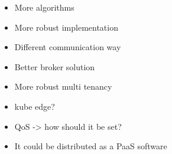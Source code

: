 
\begin{itemize}
    \item More algorithms
    \item More robust implementation
    \item Different communication way
    \item Better broker solution
    \item More robust multi tenancy
    \item kube edge?
    \item QoS -> how should it be set?
    \item It could be distributed as a PaaS software
\end{itemize}

